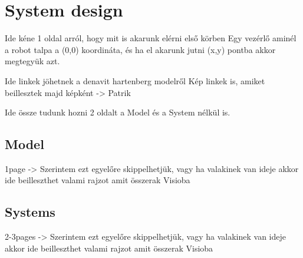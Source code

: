 \chapter{System design} \label{ch:sys_design}

	Ide kéne 1 oldal arról, hogy mit is akarunk elérni első körben 
		Egy vezérlő aminél a robot talpa a (0,0) koordináta, és ha el akarunk jutni (x,y) pontba akkor megtegyük azt.
		
		Ide linkek jöhetnek a denavit hartenberg modelről
		Kép linkek is, amiket beillesztek majd képként -> Patrik
		
		Ide össze tudunk hozni 2 oldalt a Model és a System nélkül is.

\section{Model}

	1page -> Szerintem ezt egyelőre skippelhetjük, vagy ha valakinek van ideje akkor ide beilleszthet valami rajzot amit összerak Visioba

\section{Systems}

	2-3pages -> Szerintem ezt egyelőre skippelhetjük, vagy ha valakinek van ideje akkor ide beilleszthet valami rajzot amit összerak Visioba